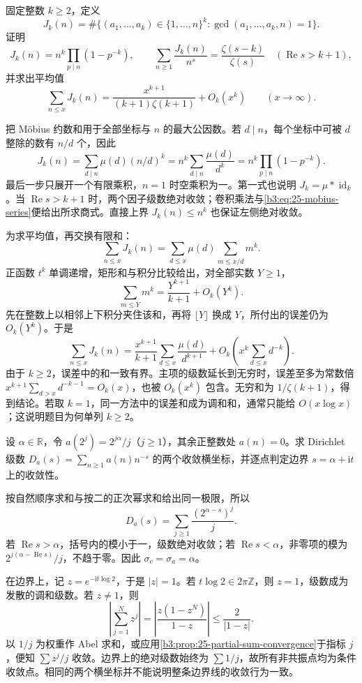 \begin{exercise}\label{b3:ex:25-3}
固定整数 \(k\ge2\)，定义
\[
 J_k(n)=\#\{(a_1,\ldots,a_k)\in\{1,\ldots,n\}^k:
                 \gcd(a_1,\ldots,a_k,n)=1\}.
\]
证明
\[
 J_k(n)=n^k\prod_{p\mid n}(1-p^{-k}),\qquad
 \sum_{n\ge1}\frac{J_k(n)}{n^s}
 =\frac{\zeta(s-k)}{\zeta(s)}
 \quad(\operatorname{Re}s>k+1),
\]
并求出平均值
\[
 \sum_{n\le x}J_k(n)
 =\frac{x^{k+1}}{(k+1)\zeta(k+1)}+O_k(x^k)
 \qquad(x\to\infty).
\]
\end{exercise}
\begin{solution}
把 Möbius 约数和用于全部坐标与 \(n\) 的最大公因数。若 \(d\mid n\)，每个坐标中可被 \(d\) 整除的数有 \(n/d\) 个，因此
\[
 J_k(n)=\sum_{d\mid n}\mu(d)(n/d)^k
       =n^k\sum_{d\mid n}\frac{\mu(d)}{d^k}
       =n^k\prod_{p\mid n}(1-p^{-k}).
\]
最后一步只展开一个有限乘积，\(n=1\) 时空乘积为一。第一式也说明 \(J_k=\mu*\operatorname{id}_k\)。当 \(\operatorname{Re}s>k+1\) 时，两个因子级数绝对收敛；卷积乘法与\eqref{b3:eq:25-mobius-series}便给出所求商式。直接上界 \(J_k(n)\le n^k\) 也保证左侧绝对收敛。

为求平均值，再交换有限和：
\[
 \sum_{n\le x}J_k(n)
 =\sum_{d\le x}\mu(d)\sum_{m\le x/d}m^k.
\]
正函数 \(t^k\) 单调递增，矩形和与积分比较给出，对全部实数 \(Y\ge1\)，
\[
 \sum_{m\le Y}m^k=\frac{Y^{k+1}}{k+1}+O_k(Y^k).
\]
先在整数上以相邻上下积分夹住该和，再将 \(\lfloor Y\rfloor\) 换成 \(Y\)，所付出的误差仍为 \(O_k(Y^k)\)。于是
\[
 \sum_{n\le x}J_k(n)
 =\frac{x^{k+1}}{k+1}\sum_{d\le x}\frac{\mu(d)}{d^{k+1}}
  +O_k\left(x^k\sum_{d\le x}d^{-k}\right).
\]
由于 \(k\ge2\)，误差中的和一致有界。主项的级数延长到无穷时，误差至多为常数倍
\(x^{k+1}\sum_{d>x}d^{-k-1}=O_k(x)\)，也被 \(O_k(x^k)\) 包含。无穷和为 \(1/\zeta(k+1)\)，得到结论。若取 \(k=1\)，同一方法中的误差和成为调和和，通常只能给 \(O(x\log x)\)；这说明题目为何单列 \(k\ge2\)。
\end{solution}

\begin{exercise}\label{b3:ex:25-4}
设 \(\alpha\in\mathbb R\)，令 \(a(2^j)=2^{j\alpha}/j\)（\(j\ge1\)），其余正整数处 \(a(n)=0\)。求 Dirichlet 级数 \(D_a(s)=\sum_{n\ge1}a(n)n^{-s}\) 的两个收敛横坐标，并逐点判定边界 \(s=\alpha+\mathrm it\) 上的收敛性。
\end{exercise}
\begin{solution}
按自然顺序求和与按二的正次幂求和给出同一极限，所以
\[
 D_a(s)=\sum_{j\ge1}\frac{(2^{\alpha-s})^j}{j}.
\]
若 \(\operatorname{Re}s>\alpha\)，括号内的模小于一，级数绝对收敛；若 \(\operatorname{Re}s<\alpha\)，非零项的模为 \(2^{j(\alpha-\operatorname{Re}s)}/j\)，不趋于零。因此 \(\sigma_c=\sigma_a=\alpha\)。

在边界上，记 \(z=e^{-\mathrm it\log2}\)，于是 \(|z|=1\)。若 \(t\log2\in2\pi\mathbb Z\)，则 \(z=1\)，级数成为发散的调和级数。若 \(z\ne1\)，则
\[
 \left|\sum_{j=1}^N z^j\right|
 =\left|\frac{z(1-z^N)}{1-z}\right|
 \le\frac2{|1-z|}.
\]
以 \(1/j\) 为权重作 Abel 求和，或应用\cref{b3:prop:25-partial-sum-convergence}于指标 \(j\)，便知 \(\sum z^j/j\) 收敛。边界上的绝对级数始终为 \(\sum1/j\)，故所有非共振点均为条件收敛点。相同的两个横坐标并不能说明整条边界线的收敛行为一致。
\end{solution}


